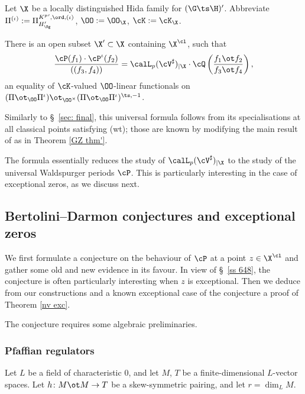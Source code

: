  \begin{theoA}\label{wald univ} Let $\X$ be a locally distinguished Hida family for $(\G\ts\H)'$.
 Abbreviate $\Pi^{(\iota)}:=  \Pi^{K^{p}{}', \ord, (\iota)}_{H'_{\Sg}}$, $\OO:=\OO_{\X}$, $\cK:=\cK_{\X}$.

There is an
open subset $\X'\subset \X$ containing $\X^{\cl}$, such that
$${\cP(f_{1})\cdot \cP^{\iota}(f_{2})    \over   ((f_{3}, f_{4}))    }
=
 \calL_{p}(\cV^{\sharp})_{|\X}
\cdot
\cQ\left( {  f_{1} \ot  f_{2}\over f_{3}\ot f_{4}}\right),
$$
 an equality of $\cK$-valued $\OO$-linear  functionals on $(\Pi\ot_{\OO} \Pi^{\iota})\ot_{\OO^{\times}} (\Pi\ot_{\OO} \Pi^{\iota})^{\ts, -1}$.
\end{theoA}
Similarly to \S~\ref{sec: final}, this universal formula follows from its specialisations at all classical points satisfying (wt); those are known by modifying the main result of  \cite{wald} as in Theorem \ref{GZ thm'}.

 The formula essentially reduces the study of $\calL_{p}(\cV^{\sharp})_{|\X}$ to the study of the universal Waldspurger periods $\cP$. This is particularly interesting in the case of exceptional zeros, as we discuss next.

\subsection{Bertolini--Darmon conjectures and exceptional zeros} 
We first  formulate a conjecture on the behaviour of $\cP$ at a point $z\in \X^{\cl}$ and gather some old and new evidence in its favour.  In view of \S~\ref{ss 648}, the conjecture is often particularly interesting when $z$ is exceptional.  Then we deduce from our constructions and a known exceptional case of the conjecture a proof of Theorem \ref{nv exc}.










The conjecture requires some algebraic preliminaries.

 \subsubsection{Pfaffian regulators}
 Let $L$ be a field  of characteristic $0$, and let $M$, $T$ be a finite-dimensional $L$-vector spaces.  Let $h\colon M\ot M\to T$ be a skew-symmetric pairing, and let $r=\dim_{L}M$.

